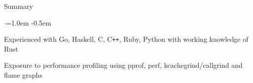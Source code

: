 \documentclass{resume} %
\begin{document}

\begin{rSection}{Summary}
  \vspace {0.5em}
  \begin{list}{$\cdot$}{\leftmargin=1.0em}
    \itemsep -0.5em \vspace{-0.5em}
    \item Experienced with Go, Haskell, C, C\texttt{++}, Ruby, Python with working
      knowledge of Rust
    \item Exposure to performance profiling using pprof, perf,
      kcachegrind/callgrind and flame graphs
  \end{list}
  \vspace{0.5em}
\end{rSection}

\end{document}
